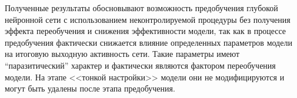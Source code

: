 Полученные результаты обосновывают возможность предобучения глубокой нейронной сети с использованием неконтролируемой процедуры без получения эффекта переобучения и снижения эффективности модели, так как в процессе предобучения фактически снижается влияние определенных параметров модели на итоговую выходную активность сети. Такие параметры имеют ``паразитический'' характер и фактически являются фактором переобучения модели. На этапе <<тонкой настройки>> модели они не модифицируются и могут быть удалены после этапа предобучения.


